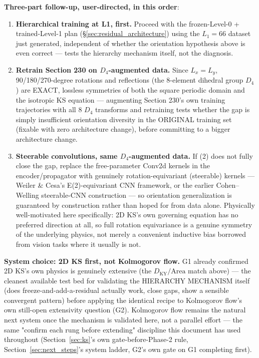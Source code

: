 \documentclass[11pt]{article}
\begin{document}
\textbf{Three-part follow-up, user-directed, in this order}:
\begin{enumerate}[nosep]
\item \textbf{Hierarchical training at L1, first.} Proceed with the
  frozen-Level-0 + trained-Level-1 plan (\S\ref{sec:residual_architecture})
  using the $L_1{=}66$ dataset just generated, independent of whether
  the orientation hypothesis above is even correct --- tests the
  hierarchy mechanism itself, not the diagnosis.
\item \textbf{Retrain Section 230 on $D_4$-augmented data.} Since
  $L_x{=}L_y$, 90/180/270-degree rotations and reflections (the 8-element
  dihedral group $D_4$) are EXACT, lossless symmetries of both the
  square periodic domain and the isotropic KS equation --- augmenting
  Section 230's own training trajectories with all 8 $D_4$ transforms
  and retraining tests whether the gap is simply insufficient
  orientation diversity in the ORIGINAL training set (fixable with zero
  architecture change), before committing to a bigger architecture
  change.
\item \textbf{Steerable convolutions, same $D_4$-augmented data.} If (2)
  does not fully close the gap, replace the free-parameter Conv2d
  kernels in the encoder/propagator with genuinely rotation-equivariant
  (steerable) kernels --- Weiler \& Cesa's E(2)-equivariant CNN
  framework, or the earlier Cohen--Welling steerable-CNN construction ---
  so orientation generalization is guaranteed by construction rather
  than hoped for from data alone. Physically well-motivated here
  specifically: 2D KS's own governing equation has no preferred
  direction at all, so full rotation equivariance is a genuine symmetry
  of the underlying physics, not merely a convenient inductive bias
  borrowed from vision tasks where it usually is not.
\end{enumerate}

\textbf{System choice: 2D KS first, not Kolmogorov flow.} G1 already
confirmed 2D KS's own physics is genuinely extensive (the
$D_{\mathrm{KY}}/\mathrm{Area}$ match above) --- the cleanest available
test bed for validating the HIERARCHY MECHANISM itself (does
freeze-and-add-a-residual actually work, close gaps, show a sensible
convergent pattern) before applying the identical recipe to Kolmogorov
flow's own still-open extensivity question (G2). Kolmogorov flow remains
the natural next system once the mechanism is validated here, not a
parallel effort --- the same "confirm each rung before extending"
discipline this document has used throughout (Section~\ref{sec:ks}'s own
gate-before-Phase-2 rule, Section~\ref{sec:next_steps}'s system ladder,
G2's own gate on G1 completing first).
\end{document}
